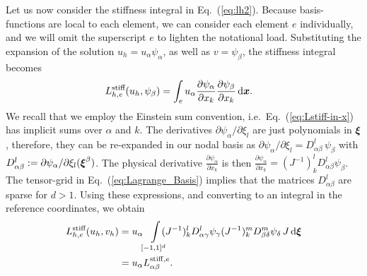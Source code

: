Let us now consider the stiffness integral in Eq.~(\ref{eq:lh2}). Because basis-functions are local to each element, we can consider each element $e$ individually, and we will omit the superscript $e$ to lighten the notational load.   Substituting the expansion of the solution $u_h=u_\alpha\psi_\alpha$, as well as $v=\psi_\beta$, the stiffness integral becomes
%
\begin{align}
  \label{eq:Lstiff-in-x}
  L^{\text{stiff}}_{h,e}(u_h, \psi_\beta) & = \int_e u_\alpha \frac{\partial\psi_\alpha}{\partial x_k}\frac{\partial \psi_\beta}{\partial x_k}\,\mathrm{d}\boldsymbol{x}.
\end{align}
We recall that we employ the Einstein sum convention, i.e.\ Eq.~(\ref{eq:Lstiff-in-x}) has implicit sums over $\alpha$ and $k$. 
  The derivatives $\partial\psi_\alpha/\partial\xi_l$ are just
polynomials in $\boldsymbol{\xi}$, therefore, they can be re-expanded in our
nodal basis as $\partial\psi_\alpha/\partial\xi_l =
D^l_{\alpha\beta}\, \psi_\beta$ with
$D^l_{\alpha\beta}:=\partial\psi_\alpha/\partial\xi_l(\boldsymbol{\xi}^\beta)$.  The physical derivative $\frac{\partial \psi_{\alpha}}{\partial x_k} $ is then $\frac{\partial \psi_\alpha}{\partial x_k} = (J^{-1})^l_kD^l_{\alpha\beta}\psi_{\beta} $. The tensor-grid in Eq.~(\ref{eq:Lagrange_Basis}) implies that 
the matrices $D^l_{\alpha\beta}$ are sparse for $d>1$.  Using these expressions, and converting to
an integral in the reference coordinates, we obtain
%
\begin{align}\label{eq:stiffness-3}
  L^{\text{stiff}}_{h,e}(u_h, v_h)
&  = u_\alpha \!
\int\displaylimits_{[-1,1]^{d}}
\!\!\!\!
    (J^{-1})^l_kD^l_{\alpha\gamma}\psi_{\gamma}
    (J^{-1})^m_kD^m_{\beta\delta}\psi_{\delta}
    \,J\,\mathrm{d}\boldsymbol{\xi}\\
\label{eq:temp-C}
    &  =u_\alpha L^{{\rm stiff},e}_{\alpha\beta}.
\end{align}
